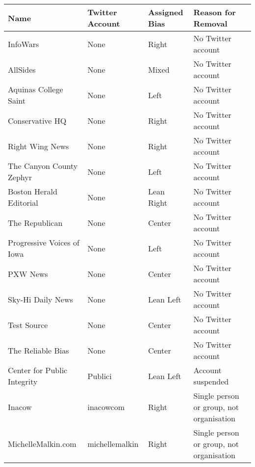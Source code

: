 \begin{tabular}{llll}
\toprule
                        Name &  Twitter Account & Assigned Bias &                        Reason for Removal \\
\midrule
                    InfoWars &             None &         Right &                        No Twitter account \\
                    AllSides &             None &         Mixed &                        No Twitter account \\
       Aquinas College Saint &             None &          Left &                        No Twitter account \\
             Conservative HQ &             None &         Right &                        No Twitter account \\
             Right Wing News &             None &         Right &                        No Twitter account \\
    The Canyon County Zephyr &             None &          Left &                        No Twitter account \\
     Boston Herald Editorial &             None &    Lean Right &                        No Twitter account \\
              The Republican &             None &        Center &                        No Twitter account \\
  Progressive Voices of Iowa &             None &          Left &                        No Twitter account \\
                    PXW News &             None &        Center &                        No Twitter account \\
           Sky-Hi Daily News &             None &     Lean Left &                        No Twitter account \\
                 Test Source &             None &        Center &                        No Twitter account \\
           The Reliable Bias &             None &        Center &                        No Twitter account \\
 Center for Public Integrity &          Publici &     Lean Left &                         Account suspended \\
                      Inacow &        inacowcom &         Right &  Single person or group, not organisation \\
          MichelleMalkin.com &   michellemalkin &         Right &  Single person or group, not organisation \\

\end{tabular}
